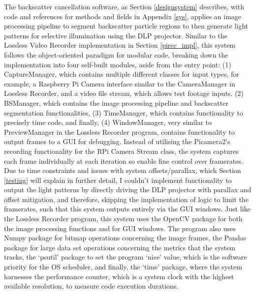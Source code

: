The backscatter cancellation software, as Section \ref{designsystem} describes, with code and references for methods and fields in Appendix \ref{sys}, applies an image processing pipeline to segment backscatter particle regions to then generate light patterns for selective illumination using the DLP projector. Similar to the Lossless Video Recorder implementation in Section \ref{pirec_impl}, this system follows the object-oriented paradigm for modular code, breaking down the implementation into four self-built modules, aside from the entry point: (1) CaptureManager, which contains multiple different classes for input types, for example, a Raspberry Pi Camera interface similar to the CameraManager in Lossless Recorder, and a video file stream, which allows test footage inputs. (2) BSManager, which contains the image processing pipeline and backscatter segmentation functionalities, (3) TimeManager, which contains functionality to precisely time code, and finally, (4) WindowManager, very similar to PreviewManager in the Lossless Recorder program, contains functionality to output frames to a GUI for debugging. Instead of utilising the Picamera2's recording functionality for the RPi Camera Stream class, the system captures each frame individually at each iteration so enable fine control over framerates.  Due to time constraints and issues with system offsets/parallax, which Section \ref{testing} will explain in further detail, I couldn't implement functionality to output the light patterns by directly driving the DLP projector with parallax and offset mitigation, and therefore, skipping the implementation of logic to limit the framerates, such that this system outputs entirely via the GUI windows. Just like the Lossless Recorder program, this system uses the OpenCV package for both the image processing functions and for GUI windows. The program also uses Numpy package for bitmap operations concerning the image frames, the Pandas package for large data set operations concerning the metrics that the system tracks, the `psutil' package to set the program `nice' value, which is the software priority for the OS scheduler, and finally, the `time' package, where the system harnesses the performance counter, which is a system clock with the highest available resolution, to measure code execution durations.

